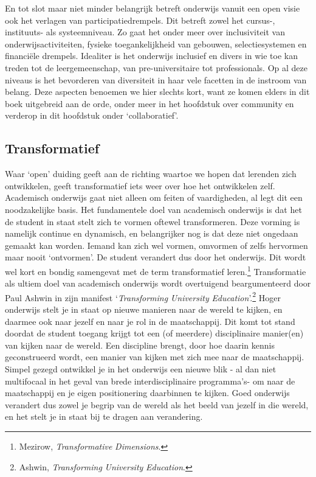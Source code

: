 \documentclass[smallauthor, chapterhaspagenum, nochapterinheader, pagenuminheader,  bigchapnum,medium2, tocpages, garamond, titleinheader]{jote-book}
\begin{document}
	En tot slot maar niet minder belangrijk betreft onderwijs vanuit een open visie ook het verlagen van participatiedrempels. Dit betreft zowel het cursus-, instituuts- als systeemniveau. Zo gaat het onder meer over inclusiviteit van onderwijsactiviteiten, fysieke toegankelijkheid van gebouwen, selectiesystemen en financiële drempels. Idealiter is het onderwijs inclusief en divers in wie toe kan treden tot de leergemeenschap, van pre-universitaire tot professionals. Op al deze niveaus is het bevorderen van diversiteit in haar vele facetten in de instroom van belang. Deze aspecten benoemen we hier slechts kort, want ze komen elders in dit boek uitgebreid aan de orde, onder meer in het hoofdstuk over community en verderop in dit hoofdstuk onder ‘collaboratief'.



	\subsection{Transformatief}



	Waar ‘open' duiding geeft aan de richting waartoe we hopen dat lerenden zich ontwikkelen, geeft transformatief iets weer over hoe het ontwikkelen zelf. Academisch onderwijs gaat niet alleen om feiten of vaardigheden, al legt dit een noodzakelijke basis. Het fundamentele doel van academisch onderwijs is dat het de student in staat stelt zich te vormen oftewel transformeren. Deze vorming is namelijk continue en dynamisch, en belangrijker nog is dat deze niet ongedaan gemaakt kan worden. Iemand kan zich wel vormen, omvormen of zelfs hervormen maar nooit ‘ontvormen'. De student verandert dus door het onderwijs. Dit wordt wel kort en bondig samengevat met de term transformatief leren.\footnote{Mezirow, \emph{Transformative}\emph{ }\emph{Dimensions}.} Transformatie als ultiem doel van academisch onderwijs wordt overtuigend beargumenteerd door Paul Ashwin in zijn manifest ‘\emph{Transforming}\emph{ University }\emph{Education}'.\footnote{Ashwin, \emph{Transforming}\emph{ University }\emph{Education}.} Hoger onderwijs stelt je in staat op nieuwe manieren naar de wereld te kijken, en daarmee ook naar jezelf en naar je rol in de maatschappij. Dit komt tot stand doordat de student toegang krijgt tot een (of meerdere) disciplinaire manier(en) van kijken naar de wereld. Een discipline brengt, door hoe daarin kennis geconstrueerd wordt, een manier van kijken met zich mee naar de maatschappij. Simpel gezegd ontwikkel je in het onderwijs een nieuwe blik - al dan niet multifocaal in het geval van brede interdisciplinaire programma's- om naar de maatschappij en je eigen positionering daarbinnen te kijken. Goed onderwijs verandert dus zowel je begrip van de wereld als het beeld van jezelf in die wereld, en het stelt je in staat bij te dragen aan verandering.
\end{document}
